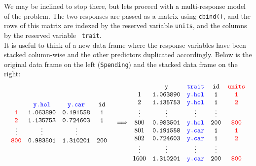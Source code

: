 \documentclass{article}
\begin{document}
 We may be inclined to stop there, but lets proceed with a multi-response model of the problem. The two responses are passed as a matrix using \texttt{cbind()}, and the rows of this matrix are indexed by the reserved variable {\color{red} \texttt{units}}, and the columns by the reserved variable \texttt{\color{blue} \texttt{trait}}.\\ 

It is useful to think of a new data frame where the response variables have been stacked column-wise and the other predictors duplicated accordingly. Below is the original data frame on the left (\texttt{Spending}) and the stacked data frame on the right:\\  

\begin{displaymath}
\begin{array}{cc}
\begin{array}{cccc}
&{\color{blue} \texttt{y.hol}}&{\color{blue} \texttt{y.car}}&\texttt{id}\\
{\color{red} \texttt{1}}&\texttt{1.063890}&\texttt{0.191558}&\texttt{1}\\
{\color{red} \texttt{2}}&\texttt{1.135753}&\texttt{0.724603}&\texttt{1}\\
\vdots&\vdots&\vdots\\
{\color{red} \texttt{800}}&\texttt{0.983501}&\texttt{1.310201}&\texttt{200}\\
\end{array}&
\Longrightarrow
\begin{array}{ccccc}
&\texttt{y}&{\color{blue} \texttt{trait}}&\texttt{id}&{\color{red} \texttt{units}}\\
1&\texttt{1.063890}&{\color{blue} \texttt{y.hol}}&\texttt{1}&{\color{red} \texttt{1}}\\
2&\texttt{1.135753}&{\color{blue} \texttt{y.hol}}&\texttt{1}&{\color{red} \texttt{2}}\\
\vdots&\vdots&\vdots&\vdots\\
800&\texttt{0.983501}&{\color{blue} \texttt{y.hol}}&\texttt{200}&{\color{red} \texttt{800}}\\
801&\texttt{0.191558}&{\color{blue} \texttt{y.car}}&\texttt{1}&{\color{red} \texttt{1}}\\
802&\texttt{0.724603}&{\color{blue} \texttt{y.car}}&\texttt{1}&{\color{red} \texttt{2}}\\
\vdots&\vdots&\vdots&\vdots\\
1600&\texttt{1.310201}&{\color{blue} \texttt{y.car}}&\texttt{200}&{\color{red} \texttt{800}}\\
\end{array}
\end{array}
\end{displaymath}
\end{document}
